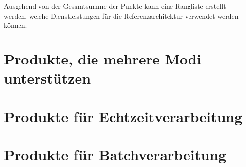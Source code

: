 Ausgehend von der Gesamtsumme der Punkte kann eine Rangliste erstellt werden, welche Dienstleistungen für die Referenzarchitektur verwendet werden können.

\section{Produkte, die mehrere Modi unterstützen}


\section{Produkte für Echtzeitverarbeitung}\label{produkte:echtzeit}



\section{Produkte für Batchverarbeitung}




